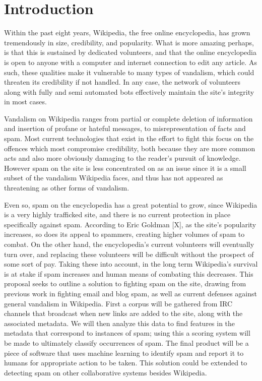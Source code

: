 \documentclass[letterpaper]{sig-alternate}
\begin{document}
\section{Introduction}
\label{sec:intro}
Within the past eight years, Wikipedia, the free online encyclopedia, has grown tremendously in size, credibility, and popularity. What is more amazing perhaps, is that this is sustained by dedicated volunteers, and that the online encyclopedia is open to anyone with a computer and internet connection to edit any article. As such, these qualities make it vulnerable to many types of vandalism, which could threaten its credibility if not handled. In any case, the network of volunteers along with fully and semi automated bots effectively maintain the site’s integrity in most cases.

Vandalism on Wikipedia ranges from partial or complete deletion of information and insertion of profane or hateful messages, to misrepresentation of facts and spam. Most current technologies that exist in the effort to fight this focus on the offences which most compromise credibility, both because they are more common acts and also more obviously damaging to the reader’s pursuit of knowledge. However spam on the site is less concentrated on as an issue since it is a small subset of the vandalism Wikipedia faces, and thus has not appeared as threatening as other forms of vandalism. 

Even so, spam on the encyclopedia has a great potential to grow, since Wikipedia is a very highly trafficked site, and there is no current protection in place specifically against spam. According to Eric Goldman [X], as the site’s popularity increases, so does its appeal to spammers, creating higher volumes of spam to combat. On the other hand, the encyclopedia’s current volunteers will eventually turn over, and replacing these volunteers will be difficult without the prospect of some sort of pay. Taking these into account, in the long term Wikipedia’s survival is at stake if spam increases and human means of combating this decreases.
This proposal seeks to outline a solution to fighting spam on the site, drawing from previous work in fighting email and blog spam, as well as current defenses against general vandalism in Wikipedia. First a corpus will be gathered from IRC channels that broadcast when new links are added to the site, along with the associated metadata. We will then analyze this data to find features in the metadata that correspond to instances of spam; using this a scoring system will be made to ultimately classify occurrences of spam. The final product will be a piece of software that uses machine learning to identify spam and report it to humans for appropriate action to be taken. This solution could be extended to detecting spam on other collaborative systems besides Wikipedia.
\end{document}
